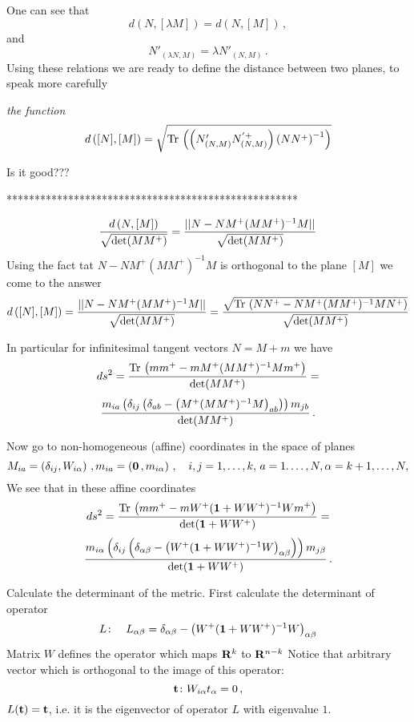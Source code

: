 One can see that
                 $$
  d(N,[\lambda M])=d(N, [M])\,,
                $$
and
         $$
       N'_{(\lambda N,M)}=\lambda 
     N'_{( N,M)}\,. 
         $$ 
Using these relations
we are ready to define the distance between two planes,
to speak more carefully {\it the function
                      $$
   d\left([N],[M]\right)=
 \sqrt {
   {\rm Tr\,}
           \left(
 \left(
     N'_{(N,M)}
     N^{'+}_{(N,M)}
\right)
 \left(
     N
     N^+
\right)^{-1}
 \right)
}
      $$

Is it good???

****************************************************

$$
{d\left(N,[M]\right)\over \sqrt {\det (MM^+)}}
=
{||N-NM^+(MM^+)^{-1}M||
\over \sqrt {\det (MM^+)}}
                      $$
Using the fact tat $N-NM^+(MM^+)^{-1}M$ is orthogonal to the plane $[M]$
we come to the answer
               $$
   d\left([N],[M]\right)=
{||N-NM^+(MM^+)^{-1}M||
\over \sqrt {\det (MM^+)}}
=
{\sqrt {{\rm Tr\,} \left(NN^+-NM^+(MM^+)^{-1}MN^+\right)}
\over \sqrt {\det (MM^+)}}
               $$


In particular for infinitesimal tangent vectors  $N=M+m$ we have
               $$
    ds^2=
              { 
 {{\rm Tr\,} \left(mm^+-mM^+(MM^+)^{-1}Mm^+\right)}
\over  {\det (MM^+)}}=
                  $$
                    $$
  {m_{ia}
            \left(\delta_{ij}
                \left(
  \delta_{ab}-\left(M^+(MM^+)^{-1}M\right)_{ab}
           \right)
           \right)m_{jb}
            \over \det (MM^+) }\,.
               $$

Now go to non-homogeneous (affine) coordinates  in the space of planes
              $$
     M_{ia}=\left(\delta_{ij}, W_{i\alpha}\right)\,,
   m_{ia}=\left({\bf 0}\,, m_{i\alpha}\right)\,,\quad
    i,j=1,\dots,k,\, a=1.\dots, N, \alpha=k+1,\dots, N,
              $$
We see that in these affine coordinates
               $$
    ds^2=
              { 
 {{\rm Tr\,} \left(mm^+-mW^+({\bf 1}+WW^+)^{-1}Wm^+\right)}
\over  {\det ({\bf 1}+WW^+)}}=
                  $$
                    $$
  {m_{i\alpha}
            \left(\delta_{ij}
                \left(
  \delta_{\alpha\beta}-\left(W^+({\bf 1}+WW^+)^{-1}W\right)_{\alpha\beta}
           \right)
           \right)m_{j\beta}
            \over \det ({\bf 1}+WW^+) }\,.
               $$



   Calculate the determinant of the metric.
First calculate the determinant of operator
                  $$
  L\colon\quad L_{\alpha\beta}=
  \delta_{\alpha\beta}-\left(W^+({\bf 1}+WW^+)^{-1}W\right)_{\alpha\beta}
                  $$
Matrix $W$ defines the operator which maps ${\bf R}^k$  to ${\bf R}^{n-k}$
Notice that  arbitrary vector which is orthogonal 
to the image of this operator:
             $$
{\bf t}\colon W_{i\alpha}t_\alpha=0\,,
             $$
$L({\bf t})={\bf t}$, i.e. it  is the eigenvector of operator $L$
with eigenvalue $1$.

}
